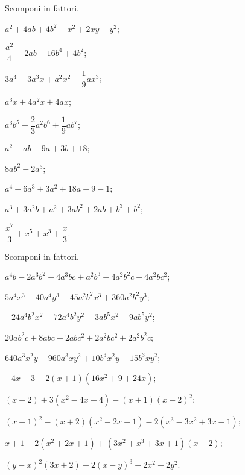 \begin{esercizio}[\Ast]
 \label{ese:13.110}
 Scomponi in fattori.
\begin{multicols}{2}
 \begin{enumeratea}
\item $a^{2}+4{ab}+4b^{2}-x^{2}+2xy-y^{2}$;
\item $\dfrac{a^{2}}{4}+2{ab}-16b^{4}+4b^{2}$;
\item $3a^{4}-3a^{3}x+a^{2}x^{2}-\dfrac{1}{9}ax^{3}$;
\item $a^{3}x+4a^{2}x+4ax$;
\item $a^{3}b^{5}-\dfrac{2}{3}a^{2}b^{6}+\dfrac{1}{9}ab^{7}$;
\item $a^{2}-{ab}-9a+3b+18$;
\item $8{ab}^{2}-2a^{3}$;
\item $a^{4}-6a^{3}+3a^{2}+18a+9-1$;
\item $a^{3}+3a^{2}b+a^{2}+3{ab}^{2}+2{ab}+b^{3}+b^{2}$;
\item $\dfrac{x^{7}}{3}+x^{5}+x^{3}+\dfrac{x}{3}$.
 \end{enumeratea}
\end{multicols}
\end{esercizio}

\begin{esercizio}[\Ast]
 \label{ese:13.111}
 Scomponi in fattori.
 \begin{enumeratea}
\item $a^{4}b-2a^{3}b^{2}+4a^{3}{bc}+a^{2}b^{3}-4a^{2}b^{2}c+4a^{2}bc^{2}$;
\item $5a^{4}x^{3}-40a^{4}y^{3}-45a^{2}b^{2}x^{3}+360a^{2}b^{2}y^{3}$;
\item $-24a^{4}b^{2}x^{2}-72a^{4}b^{2}y^{2}-3ab^{5}x^{2}-9ab^{5}y^{2}$;
\item $20ab^{2}c+8abc+2abc^{2}+2a^{2}bc^{2}+2a^{2}b^{2}c$;
\item $640a^{3}x^{2}y-960a^{3}xy^{2}+10b^{3}x^{2}y-15b^{3}xy^{2}$;
\item $-4x-3-2(x+1)(16x^{2}+9+24x)$;
\item $(x-2)+3(x^{2}-4x+4)-(x+1)(x-2)^{2}$;
\item $(x-1)^{2}-(x+2)(x^{2}-2x+1)-2(x^{3}-3x^{2}+3x-1)$;
\item $x+1-2(x^{2}+2x+1)+(3x^{2}+x^{3}+3x+1)(x-2)$;
\item $(y-x)^{2}(3x+2)-2(x-y)^{3}-2x^{2}+2y^{2}$.
 \end{enumeratea}
\end{esercizio}


